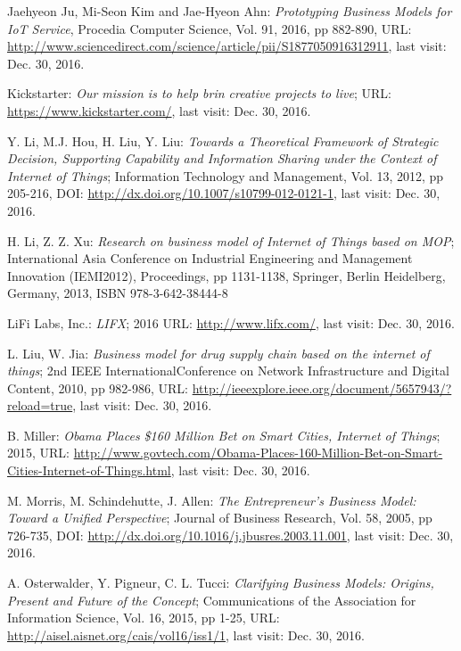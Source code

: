 \begin{thebibliography}{99}
 	 Jaehyeon Ju, Mi-Seon Kim and Jae-Hyeon Ahn: \emph{Prototyping Business Models for IoT Service}, Procedia Computer Science, Vol. 91, 2016, pp 882-890, URL: \url{http://www.sciencedirect.com/science/article/pii/S1877050916312911}, last visit: Dec. 30, 2016.
 	
 	 Kickstarter: \emph{Our mission is to help brin creative projects to live}; URL: \url{https://www.kickstarter.com/}, last visit: Dec. 30, 2016.
	
	 Y. Li, M.J. Hou, H. Liu, Y. Liu: \emph{Towards a Theoretical Framework of Strategic Decision, Supporting Capability and Information Sharing under the Context of Internet of Things}; Information Technology and Management, Vol. 13, 2012, pp 205-216, DOI: \url{http://dx.doi.org/10.1007/s10799-012-0121-1}, last visit: Dec. 30, 2016.
	
	 H. Li, Z. Z. Xu: \emph{Research on business model of Internet of Things based on MOP}; International Asia Conference on Industrial Engineering and Management Innovation (IEMI2012), Proceedings, pp 1131-1138, Springer, Berlin Heidelberg, Germany, 2013, ISBN 978-3-642-38444-8 

	 LiFi Labs, Inc.: \emph{LIFX}; 2016 URL: \url{http://www.lifx.com/}, last visit: Dec. 30, 2016.

	 L. Liu, W. Jia: \emph{Business model for drug supply chain based on the internet of things}; 2nd IEEE InternationalConference on Network Infrastructure and Digital Content, 2010, pp 982-986, URL: \url{http://ieeexplore.ieee.org/document/5657943/?reload=true}, last visit: Dec. 30, 2016.

	 B. Miller: \emph{Obama Places \$160 Million Bet on Smart Cities, Internet of Things}; 2015, URL: \url{http://www.govtech.com/Obama-Places-160-Million-Bet-on-Smart-Cities-Internet-of-Things.html}, last visit: Dec. 30, 2016.

	 M. Morris, M. Schindehutte, J. Allen: \emph{The Entrepreneur's Business Model: Toward a Unified Perspective}; Journal of Business Research, Vol. 58, 2005, pp 726-735, DOI: \url{http://dx.doi.org/10.1016/j.jbusres.2003.11.001}, last visit: Dec. 30, 2016.

	 A. Osterwalder, Y. Pigneur, C. L. Tucci: \emph{Clarifying Business Models: Origins, Present and Future of the Concept}; Communications of the Association for Information Science, Vol. 16, 2015, pp 1-25, URL: \url{http://aisel.aisnet.org/cais/vol16/iss1/1}, last visit: Dec. 30, 2016.


\end{thebibliography}
